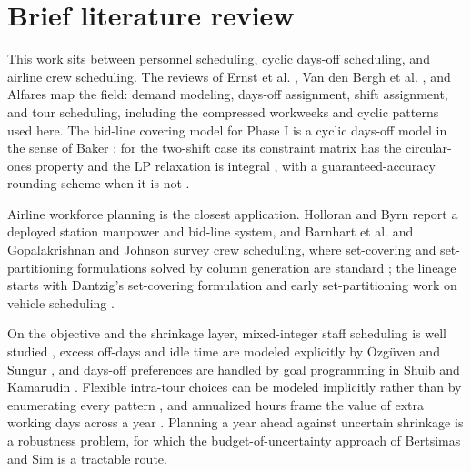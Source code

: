 \documentclass[preprint,12pt]{elsarticle}
\begin{document}
\section{Brief literature review}\label{sec:lit}
   This work sits between personnel scheduling, cyclic days-off scheduling, and airline crew scheduling. The reviews of Ernst et al. \citep{ernst2004staff}, Van den Bergh et al. \citep{vandenbergh2013personnel}, and Alfares \citep{alfares2004survey} map the field: demand modeling, days-off assignment, shift assignment, and tour scheduling, including the compressed workweeks and cyclic patterns used here. The bid-line covering model for Phase I is a cyclic days-off model in the sense of Baker \citep{baker1974scheduling}; for the two-shift case its constraint matrix has the circular-ones property and the LP relaxation is integral \citep{bartholdi1980cyclic}, with a guaranteed-accuracy rounding scheme when it is not \citep{bartholdi1981roundoff}.

   Airline workforce planning is the closest application. Holloran and Byrn \citep{holloran1986united} report a deployed station manpower and bid-line system, and Barnhart et al. \citep{barnhart2003applications} and Gopalakrishnan and Johnson \citep{gopalakrishnan2005airline} survey crew scheduling, where set-covering and set-partitioning formulations solved by column generation are standard \citep{dantzig1960decomposition,vance1997airline,desaulniers2005column,irnich2005shortest}; the lineage starts with Dantzig's set-covering formulation \citep{dantzig1954comment} and early set-partitioning work on vehicle scheduling \citep{foster1976integer}.

   On the objective and the shrinkage layer, mixed-integer staff scheduling is well studied \citep{beaumont1997scheduling}, excess off-days and idle time are modeled explicitly by \"Ozg\"uven and Sungur \citep{ozguven2013integer}, and days-off preferences are handled by goal programming in Shuib and Kamarudin \citep{shuib2018solving}. Flexible intra-tour choices can be modeled implicitly rather than by enumerating every pattern \citep{bechtold1990implicit}, and annualized hours frame the value of extra working days across a year \citep{corominas2005annualised}. Planning a year ahead against uncertain shrinkage is a robustness problem, for which the budget-of-uncertainty approach of Bertsimas and Sim \citep{bertsimas2004price} is a tractable route.

\end{document}

